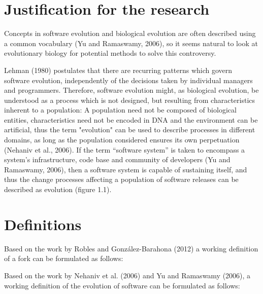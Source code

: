 
\section{Justification for the research}

Concepts in software evolution and biological evolution are often described using a common vocabulary (Yu and Ramaswamy, 2006), so it seems natural to look at evolutionary biology for potential methods to solve this controversy.

Lehman (1980) postulates that there are recurring patterns which govern software evolution, independently of the decisions taken by individual managers and programmers. Therefore, software evolution might, as biological evolution, be understood as a process which is not designed, but resulting from characteristics inherent to a population: A population need not be composed of biological entities, characteristics need not be encoded in DNA and the environment can be artificial, thus the term "evolution" can be used to describe processes in different domains, as long as the population considered ensures its own perpetuation (Nehaniv et al., 2006). If the term “software system” is taken to encompass a system's infrastructure, code base and community of developers (Yu and Ramaswamy, 2006), then a software system is capable of sustaining itself, and thus the change processes affecting a population of software releases can be described as evolution (figure 1.1).


\section{Definitions}

Based on the work by Robles and González-Barahona (2012) a working definition of a fork can be formulated as follows:


\noindent
Based on the work by Nehaniv et al. (2006) and Yu and Ramaswamy (2006), a working definition of the evolution of software can be formulated as follows:

